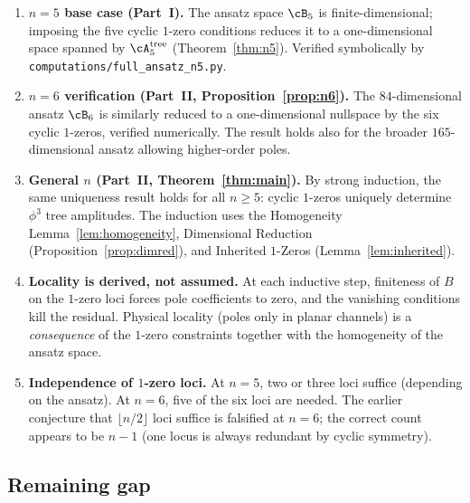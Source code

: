 \begin{enumerate}[label=(\arabic*)]
  \item \textbf{$n = 5$ base case (Part~I).}
    The ansatz space $\cB_5$ is finite-dimensional;
    imposing the five cyclic $1$-zero conditions
    reduces it to a one-dimensional space spanned
    by $\cA_5^{\mathrm{tree}}$ (Theorem~\ref{thm:n5}).
    Verified symbolically by
    \texttt{computations/full\_ansatz\_n5.py}.

  \item \textbf{$n = 6$ verification (Part~II,
    Proposition~\ref{prop:n6}).}
    The $84$-dimensional ansatz $\cB_6$ is similarly
    reduced to a one-dimensional nullspace by the six
    cyclic $1$-zeros, verified numerically.
    The result holds also for the broader $165$-dimensional
    ansatz allowing higher-order poles.

  \item \textbf{General $n$ (Part~II, Theorem~\ref{thm:main}).}
    By strong induction, the same uniqueness result holds
    for all $n \geq 5$: cyclic $1$-zeros uniquely determine
    $\phi^3$ tree amplitudes. The induction uses the
    Homogeneity Lemma~\ref{lem:homogeneity},
    Dimensional Reduction (Proposition~\ref{prop:dimred}),
    and Inherited $1$-Zeros (Lemma~\ref{lem:inherited}).

  \item \textbf{Locality is derived, not assumed.}
    At each inductive step, finiteness of $B$ on the
    $1$-zero loci forces pole coefficients to zero,
    and the vanishing conditions kill the residual.
    Physical locality (poles only in planar channels)
    is a \emph{consequence} of the $1$-zero constraints
    together with the homogeneity of the ansatz space.

  \item \textbf{Independence of $1$-zero loci.}
    At $n = 5$, two or three loci suffice (depending on
    the ansatz). At $n = 6$, five of the six loci are
    needed. The earlier conjecture that $\lfloor n/2 \rfloor$
    loci suffice is falsified at $n = 6$; the correct
    count appears to be $n - 1$ (one locus is always
    redundant by cyclic symmetry).
\end{enumerate}

\subsection*{Remaining gap}

